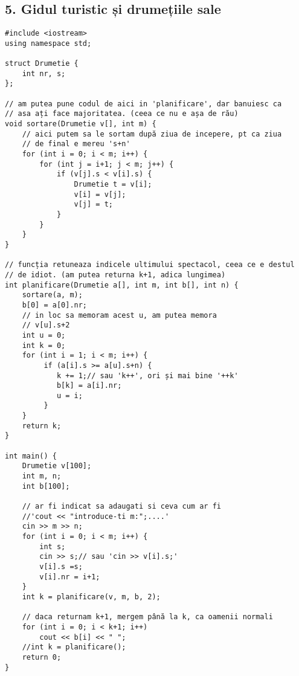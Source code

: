 \documentclass[11pt]{article}
\begin{document}
\subsection*{5. Gidul turistic și drumețiile sale}
\label{sec:orgf53fff2}
\begin{verbatim}
#include <iostream>
using namespace std;

struct Drumetie {
    int nr, s;
};

// am putea pune codul de aici in 'planificare', dar banuiesc ca
// asa ați face majoritatea. (ceea ce nu e așa de rău)
void sortare(Drumetie v[], int m) {
    // aici putem sa le sortam după ziua de incepere, pt ca ziua
    // de final e mereu 's+n'
    for (int i = 0; i < m; i++) {
        for (int j = i+1; j < m; j++) {
            if (v[j].s < v[i].s) {
                Drumetie t = v[i];
                v[i] = v[j];
                v[j] = t;
            }
        }
    }
}

// funcția retuneaza indicele ultimului spectacol, ceea ce e destul
// de idiot. (am putea returna k+1, adica lungimea)
int planificare(Drumetie a[], int m, int b[], int n) {
    sortare(a, m);
    b[0] = a[0].nr;
    // in loc sa memoram acest u, am putea memora
    // v[u].s+2
    int u = 0;
    int k = 0;
    for (int i = 1; i < m; i++) {
         if (a[i].s >= a[u].s+n) {
            k += 1;// sau 'k++', ori și mai bine '++k'
            b[k] = a[i].nr;
            u = i;
         }
    }
    return k;
}

int main() {
    Drumetie v[100];
    int m, n;
    int b[100];

    // ar fi indicat sa adaugati si ceva cum ar fi
    //'cout << "introduce-ti m:";....'
    cin >> m >> n;
    for (int i = 0; i < m; i++) {
        int s;
        cin >> s;// sau 'cin >> v[i].s;'
        v[i].s =s;
        v[i].nr = i+1;
    }
    int k = planificare(v, m, b, 2);

    // daca returnam k+1, mergem până la k, ca oamenii normali
    for (int i = 0; i < k+1; i++)
        cout << b[i] << " ";
    //int k = planificare();
    return 0;
}

\end{verbatim}
\end{document}
